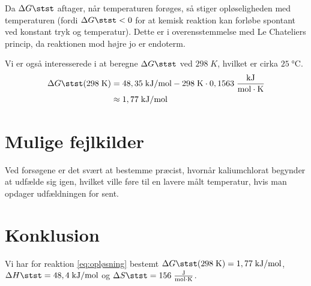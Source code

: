 \documentclass{report}
\begin{document}
Da $\Delta G \stst $ aftager, når temperaturen forøges, så stiger opløseligheden med temperaturen (fordi $\Delta G \stst <0$ for at kemisk reaktion kan forløbe spontant ved konstant tryk og temperatur).  
Dette er i overensstemmelse med Le Chateliers princip, da reaktionen mod højre jo er endoterm.

Vi er også interesserede i at beregne $\Delta G \stst $ ved $298 \;\unit{K} $, hvilket er cirka $25 \;\unit{\celsius} $.
\begin{equation*}
\begin{split}
  \Delta G \stst (298 \;\unit{K} )&=48,35 \;\unit{kJ/mol} -298 \;\unit{K} \cdot 0,1563 \;\unit{\frac{kJ}{mol \cdot K}} \\
  &\approx 1,77 \;\unit{kJ/mol} 
\end{split}
\end{equation*}
\section*{Mulige fejlkilder}
Ved forsøgene er det svært at bestemme præcist, hvornår kaliumchlorat begynder at udfælde sig igen, hvilket ville føre til en lavere målt temperatur, hvis man opdager udfældningen for sent.

\section*{Konklusion}
Vi har for reaktion \ref{eq:opløsning} bestemt $\Delta G \stst (298 \;\unit{K} )=1,77 \;\unit{kJ/mol} $, $\Delta H \stst =48,4 \;\unit{kJ/mol} $ og $\Delta S \stst =156 \;\unit{\frac{J}{mol \cdot K}} $. 
\end{document}
